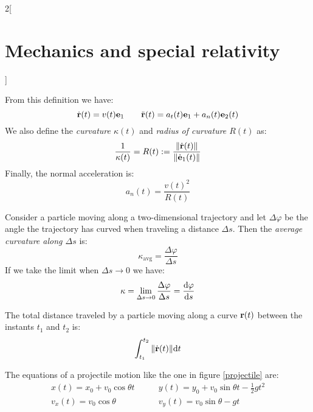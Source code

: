 \documentclass[../../../main.tex]{subfiles}
\begin{document}
\begin{multicols}{2}[\section{Mechanics and special relativity}]
\begin{definition}
    From this definition we have: $$\dot{\boldsymbol{\mathrm{r}}}(t)=v(t)\boldsymbol{\mathrm{e}}_1\qquad\ddot{\boldsymbol{\mathrm{r}}}(t)=a_t(t)\boldsymbol{\mathrm{e}}_1+a_n(t)\boldsymbol{\mathrm{e}}_2(t)$$ We also define the \textit{curvature $\kappa(t)$} and \textit{radius of curvature $R(t)$} as: $$\frac{1}{\kappa(t)}=R(t):=\frac{\|\dot{\boldsymbol{\mathrm{r}}}(t)\|}{\|\dot{\boldsymbol{\mathrm{e}}}_1(t)\|}$$ Finally, the normal acceleration is: $$a_n(t)=\frac{v(t)^2}{R(t)}$$
  \end{definition}
  \begin{prop}[Curvature]
    Consider a particle moving along a two-dimensional trajectory and let $\Delta\varphi$ be the angle the trajectory has curved when traveling a distance $\Delta s$. Then the \textit{average curvature along $\Delta s$} is: $$\kappa_\text{avg}=\frac{\Delta \varphi}{\Delta s}$$ If we take the limit when $\Delta s\to 0$ we have: $$\kappa=\lim_{\Delta s\to 0}\frac{\Delta \varphi}{\Delta s}=\dv{\varphi}{s}$$
  \end{prop}
  \begin{prop}
    The total distance traveled by a particle moving along a curve $\boldsymbol{\mathrm{r}}(t)$ between the instants $t_1$ and $t_2$ is: $$\int_{t_1}^{t_2}\|\dot{\boldsymbol{\mathrm{r}}}(t)\|\dd t$$
  \end{prop}
  \begin{prop}
    The equations of a projectile motion like the one in figure \ref{projectile} are:
    \begin{align*}
      x(t)=x_0+v_0\cos\theta t\quad & \quad y(t)=y_0+v_0\sin\theta t-\frac{1}{2}gt^2 \\
      v_x(t)=v_0\cos\theta\quad     & \quad v_y(t)=v_0\sin\theta-gt
    \end{align*}
    \begin{center}
      \begin{minipage}{\linewidth}
        \centering
        
        \label{projectile}
      \end{minipage}
    \end{center}
  \end{prop}

\end{multicols}
\end{document}
